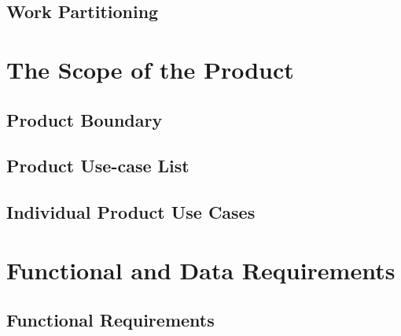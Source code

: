 \documentclass{scrreprt}
\begin{document}
\subsection{Work Partitioning}

\section{The Scope of the Product}

\subsection{Product Boundary}

\subsection{Product Use-case List}

\subsection{Individual Product Use Cases}

\section{Functional and Data Requirements}

\subsection{Functional Requirements}
\end{document}
